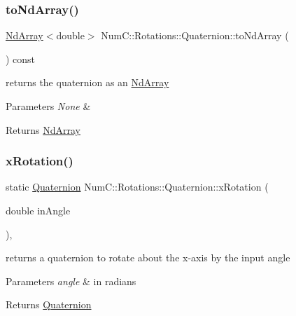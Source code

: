 \subsubsection{\texorpdfstring{to\+Nd\+Array()}{toNdArray()}}
{\footnotesize\ttfamily \mbox{\hyperlink{class_num_c_1_1_nd_array}{Nd\+Array}}$<$double$>$ Num\+C\+::\+Rotations\+::\+Quaternion\+::to\+Nd\+Array (\begin{DoxyParamCaption}{ }\end{DoxyParamCaption}) const\hspace{0.3cm}{\ttfamily [inline]}}

returns the quaternion as an \mbox{\hyperlink{class_num_c_1_1_nd_array}{Nd\+Array}}


\begin{DoxyParams}{Parameters}
{\em None} & \\
\hline
\end{DoxyParams}
\begin{DoxyReturn}{Returns}
\mbox{\hyperlink{class_num_c_1_1_nd_array}{Nd\+Array}} 
\end{DoxyReturn}
\mbox{\label{class_num_c_1_1_rotations_1_1_quaternion_a8e068b817fc2d7018e7f6fd1ede977fa}} 
\subsubsection{\texorpdfstring{x\+Rotation()}{xRotation()}}
{\footnotesize\ttfamily static \mbox{\hyperlink{class_num_c_1_1_rotations_1_1_quaternion}{Quaternion}} Num\+C\+::\+Rotations\+::\+Quaternion\+::x\+Rotation (\begin{DoxyParamCaption}\item[{double}]{in\+Angle }\end{DoxyParamCaption})\hspace{0.3cm}{\ttfamily [inline]}, {\ttfamily [static]}}

returns a quaternion to rotate about the x-\/axis by the input angle


\begin{DoxyParams}{Parameters}
{\em angle} & in radians \\
\hline
\end{DoxyParams}
\begin{DoxyReturn}{Returns}
\mbox{\hyperlink{class_num_c_1_1_rotations_1_1_quaternion}{Quaternion}} 
\end{DoxyReturn}
\mbox{\label{class_num_c_1_1_rotations_1_1_quaternion_a750deeaf628f5ebf2f32187f998b448a}} 
